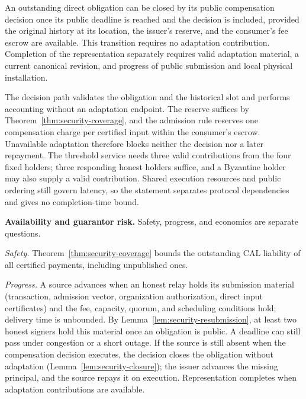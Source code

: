 \begin{lemma}
\label{lem:security-closure}
An outstanding direct obligation can be closed by its public
compensation decision once its public deadline is reached and the
decision is included, provided the original history at its location, the
issuer's reserve, and the consumer's fee escrow are available. This
transition requires no adaptation contribution. Completion of the
representation separately requires valid adaptation material, a current
canonical revision, and progress of public submission and local physical
installation.
\end{lemma}
\begin{IEEEproof}
The decision path validates the obligation and the historical slot and performs accounting without an adaptation endpoint. The reserve suffices by Theorem~\ref{thm:security-coverage}, and the admission rule reserves one compensation charge per certified input within the consumer's escrow. Unavailable adaptation therefore blocks neither the decision nor a later repayment. The threshold service needs three valid contributions from the four fixed holders; three responding honest holders suffice, and a Byzantine holder may also supply a valid contribution. Shared execution resources and public ordering still govern latency, so the statement separates protocol dependencies and gives no completion-time bound.
\end{IEEEproof}

\noindent\textbf{Availability and guarantor risk.}
Safety, progress, and economics are separate questions.

\emph{Safety.} Theorem~\ref{thm:security-coverage} bounds the outstanding CAL liability
of all certified payments, including unpublished ones.

\emph{Progress.} A source advances when an honest relay holds its
submission material (transaction, admission vector, organization
authorization, direct input certificates) and the fee, capacity,
quorum, and scheduling conditions hold; delivery time is unbounded. By
Lemma~\ref{lem:security-resubmission}, at least two honest signers hold
this material once an obligation is public. A deadline can still pass
under congestion or a short outage. If the source is still absent when
the compensation decision executes, the decision closes the obligation
without adaptation (Lemma~\ref{lem:security-closure}); the issuer
advances the missing principal, and the source repays it on execution.
Representation completes when adaptation contributions are available.

